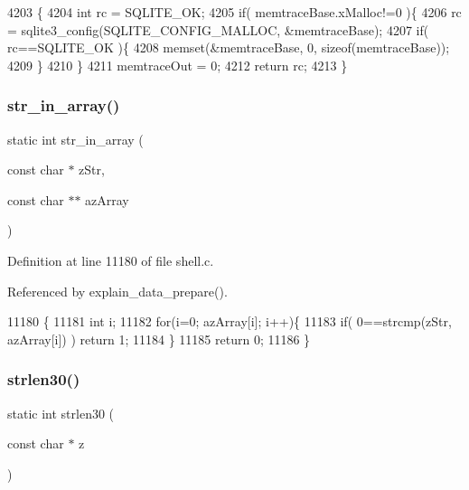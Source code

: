 \begin{DoxyCode}
4203                                    \{
4204   \textcolor{keywordtype}{int} rc = SQLITE_OK;
4205   \textcolor{keywordflow}{if}( memtraceBase.xMalloc!=0 )\{
4206     rc = sqlite3_config(SQLITE_CONFIG_MALLOC, &memtraceBase);
4207     \textcolor{keywordflow}{if}( rc==SQLITE_OK )\{
4208       memset(&memtraceBase, 0, \textcolor{keyword}{sizeof}(memtraceBase));
4209     \}
4210   \}
4211   memtraceOut = 0;
4212   \textcolor{keywordflow}{return} rc;
4213 \}
\end{DoxyCode}
\mbox{\label{shell_8c_a327490f2055e211f2c98f96795f9edab}} 
\subsubsection{str\+\_\+in\+\_\+array()}
{\footnotesize\ttfamily static int str\+\_\+in\+\_\+array (\begin{DoxyParamCaption}\item[{const char $\ast$}]{z\+Str,  }\item[{const char $\ast$$\ast$}]{az\+Array }\end{DoxyParamCaption})\hspace{0.3cm}{\ttfamily [static]}}



Definition at line 11180 of file shell.\+c.



Referenced by explain\+\_\+data\+\_\+prepare().


\begin{DoxyCode}
11180                                                                \{
11181   \textcolor{keywordtype}{int} i;
11182   \textcolor{keywordflow}{for}(i=0; azArray[i]; i++)\{
11183     \textcolor{keywordflow}{if}( 0==strcmp(zStr, azArray[i]) ) \textcolor{keywordflow}{return} 1;
11184   \}
11185   \textcolor{keywordflow}{return} 0;
11186 \}
\end{DoxyCode}
\mbox{\label{shell_8c_a3dfa9c08ff026e7589f87f53025362a9}} 
\subsubsection{strlen30()}
{\footnotesize\ttfamily static int strlen30 (\begin{DoxyParamCaption}\item[{const char $\ast$}]{z }\end{DoxyParamCaption})\hspace{0.3cm}{\ttfamily [static]}}



